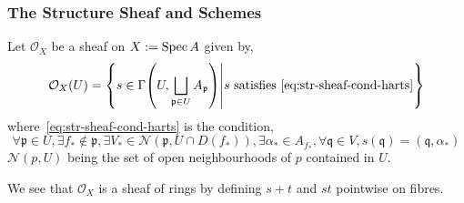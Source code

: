 \documentclass[000-main.tex]{subfiles}
\begin{document}
\subsubsection{The Structure Sheaf and Schemes}%
\label{sec:structure-sheaf}

\begin{definition}
  Let $\mathcal{O}_X$ be a sheaf on $X := \operatorname{Spec} A$ given by,
  \[
    \mathcal{O}_X(U) = \qty{
      s \in \Gamma\qty(U, \bigsqcup_{\mathfrak{p} \in U} A_{\mathfrak{p}})
      \middle\vert
      s\text{ satisfies~\eqref{eq:str-sheaf-cond-harts}}
    }
  \]
  where~\eqref{eq:str-sheaf-cond-harts} is the condition,
  \begin{equation} \label{eq:str-sheaf-cond-harts}
      \forall \mathfrak{p}\in U,
      \exists f_{\ast} \not\in \mathfrak{p},
      \exists V_{\ast}\in \mathcal{N}(\mathfrak{p}, U\cap D(f_{\ast})),
      \exists \alpha_{\ast} \in A_{f_\ast},
      \forall \mathfrak{q} \in V, s(\mathfrak{q}) = (\mathfrak{q}, \alpha_{\ast})
  \end{equation}
  $\mathcal{N}(p, U)$ being the set of open neighbourhoods of $p$ contained in $U$.

  We see that $\mathcal{O}_X$ is a sheaf of rings by defining $s + t$ and $st$ pointwise on fibres.
\end{definition}
\end{document}

